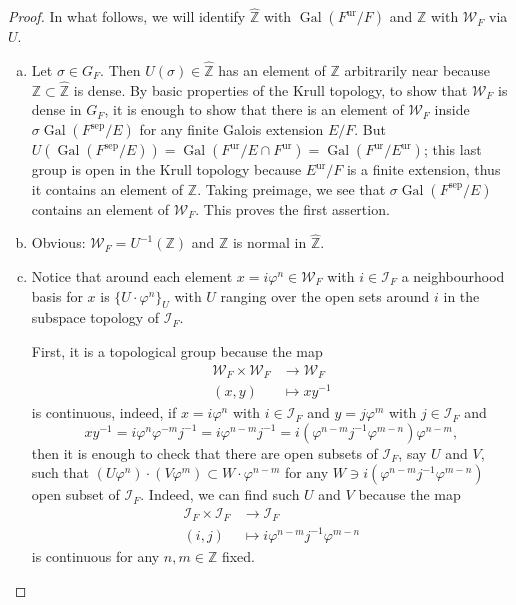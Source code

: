 \documentclass[12pt]{article}
\theoremstyle{plain}
\theoremstyle{definition}
\newcommand{\integers}{\mathbb{Z}}
\renewcommand{\hat}[1]{\widehat{#1}}
\newcommand{\Gal}[2]{\operatorname{Gal} ( #1 / #2 )}
\newcommand{\sep}[1]{{#1}^{\operatorname{sep}}}
\newcommand{\ur}[1]{{#1}^{\operatorname{ur}}}
\newcommand{\inercia}[1]{\mathcal I_{#1}}
\newcommand{\weil}[1]{\mathcal W_{#1}}
\begin{document}
\begin{proof}
In what follows, we will identify $\hat \integers$ with $\Gal {\ur F} F$ and $\integers$ with $\weil F$ via $U$.
\begin{enumerate}[(a)]
\item Let $\sigma \in G_F$. Then $U (\sigma) \in \hat \integers$ has an element of $\integers$ arbitrarily near because $\integers \subset \hat \integers$ is dense. By basic properties of the Krull topology, to show that $\weil F$ is dense in $G_F$, it is enough to show that there is an element of $\weil F$ inside $\sigma \Gal {\sep F}{E}$ for any finite Galois extension $E/F$. But $U(\Gal {\sep F} E) = \Gal {\ur F} {E \cap \ur F} = \Gal {\ur F} { \ur E}$; this last group is open in the Krull topology because $\ur E / F$ is a finite extension, thus it contains an element of $\integers$. Taking preimage, we see that $\sigma \Gal {\sep F} {E}$ contains an element of $\weil F$. This proves the first assertion.
\item Obvious: $\weil F = U^{-1} (\integers)$ and $\integers$ is normal in $\hat \integers$.
\item Notice that around each element $x = i \varphi^n \in \weil F$ with $i \in \inercia F$ a neighbourhood basis for $x$ is $\{U \cdot \varphi^n\}_U$ with $U$ ranging over the open sets around $i$ in the subspace topology of $\inercia F$.

First, it is a topological group because the map
\begin{align*}
\weil F \times \weil F &\longrightarrow \weil F \\
(x,y) &\longmapsto xy^{-1}
\end{align*}
is continuous, indeed, if $x = i \varphi^n$ with $i \in \inercia F$ and $y = j \varphi^m$ with $j \in \inercia F$ and
\[
    xy^{-1} = i \varphi^n \varphi^{-m} j^{-1} = i \varphi^{n-m}j^{-1} = i (\varphi^{n-m} j^{-1} \varphi^{m-n}) \varphi^{n-m},
\]
then it is enough to check that there are open subsets of $\inercia F$, say $U$ and $V$, such that $(U \varphi^{n}) \cdot (V \varphi^{m}) \subset W \cdot \varphi^{n - m}$ for any $W \ni i (\varphi^{n-m} j^{-1} \varphi^{m-n})$ open subset of $\inercia F$. Indeed, we can find such $U$ and $V$ because the map
\begin{align*}
\inercia F \times \inercia F &\longrightarrow \inercia F \\
(i, j) &\longmapsto i \varphi^{n-m} j^{-1} \varphi^{m-n}
\end{align*}
is continuous for any $n,m \in \integers$ fixed.


\end{enumerate}
\end{proof}
\end{document}
